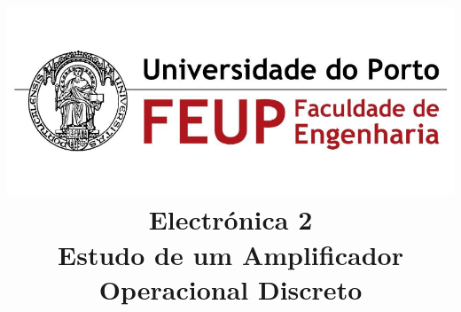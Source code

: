 \documentclass[a4paper]{article}
\begin{document}


\title{\includegraphics[scale=0.5]{feup_logo.png}\\
    \bigskip
    \bigskip
    \bigskip
    \bigskip
    \bigskip
    \bigskip
    \bigskip
    \bigskip
    \huge{Electrónica 2}\\
    \bigskip
    \bigskip
    \Huge\textbf{Estudo de um Amplificador Operacional Discreto}
}
\end{document}

